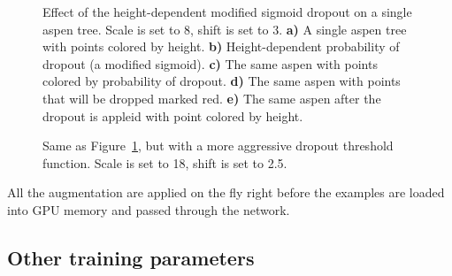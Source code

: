 \begin{figure}
{}
\caption[Effect of the height-dependent modified sigmoid dropout on a single aspen tree.]{\label{fig-height-dropout}Effect of the height-dependent
modified sigmoid dropout on a single aspen tree. Scale is set to 8,
shift is set to 3. \textbf{a)} A single aspen tree with points colored
by height. \textbf{b)} Height-dependent probability of dropout (a
modified sigmoid). \textbf{c)} The same aspen with points colored by
probability of dropout. \textbf{d)} The same aspen with points that will
be dropped marked red. \textbf{e)} The same aspen after the dropout is
appleid with point colored by height.}
\end{figure}

\begin{figure}
\caption[Effect of a stronger height-dependent modified sigmoid dropout on a single aspen tree.]{\label{fig-height-dropout-aggressive}Same as
Figure~\ref{fig-height-dropout}, but with a more aggressive dropout
threshold function. Scale is set to 18, shift is set to 2.5.}
\end{figure}

All the augmentation are applied on the fly right before the examples are loaded into GPU memory and passed through the network.

\subsection{Other training parameters}\label{sec-other-training-params}

